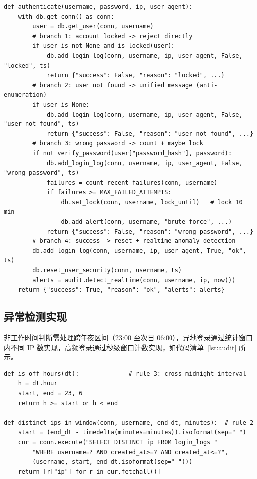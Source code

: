 \documentclass[bwprint]{report}
\begin{document}
\begin{lstlisting}[caption={登录认证主流程（security.authenticate 节选）}, label={lst:auth}]
def authenticate(username, password, ip, user_agent):
    with db.get_conn() as conn:
        user = db.get_user(conn, username)
        # branch 1: account locked -> reject directly
        if user is not None and is_locked(user):
            db.add_login_log(conn, username, ip, user_agent, False, "locked", ts)
            return {"success": False, "reason": "locked", ...}
        # branch 2: user not found -> unified message (anti-enumeration)
        if user is None:
            db.add_login_log(conn, username, ip, user_agent, False, "user_not_found", ts)
            return {"success": False, "reason": "user_not_found", ...}
        # branch 3: wrong password -> count + maybe lock
        if not verify_password(user["password_hash"], password):
            db.add_login_log(conn, username, ip, user_agent, False, "wrong_password", ts)
            failures = count_recent_failures(conn, username)
            if failures >= MAX_FAILED_ATTEMPTS:
                db.set_lock(conn, username, lock_until)   # lock 10 min
                db.add_alert(conn, username, "brute_force", ...)
            return {"success": False, "reason": "wrong_password", ...}
        # branch 4: success -> reset + realtime anomaly detection
        db.add_login_log(conn, username, ip, user_agent, True, "ok", ts)
        db.reset_user_security(conn, username, ts)
        alerts = audit.detect_realtime(conn, username, ip, now())
    return {"success": True, "reason": "ok", "alerts": alerts}
\end{lstlisting}

\subsection{异常检测实现}
非工作时间判断需处理跨午夜区间（23:00 至次日 06:00），异地登录通过统计窗口内不同 IP 数实现，高频登录通过秒级窗口计数实现，如代码清单~\ref{lst:audit} 所示。

\begin{lstlisting}[caption={异常规则判断（audit.py 节选）}, label={lst:audit}]
def is_off_hours(dt):              # rule 3: cross-midnight interval
    h = dt.hour
    start, end = 23, 6
    return h >= start or h < end

def distinct_ips_in_window(conn, username, end_dt, minutes):  # rule 2
    start = (end_dt - timedelta(minutes=minutes)).isoformat(sep=" ")
    cur = conn.execute("SELECT DISTINCT ip FROM login_logs "
        "WHERE username=? AND created_at>=? AND created_at<=?",
        (username, start, end_dt.isoformat(sep=" ")))
    return [r["ip"] for r in cur.fetchall()]
\end{lstlisting}
\end{document}
